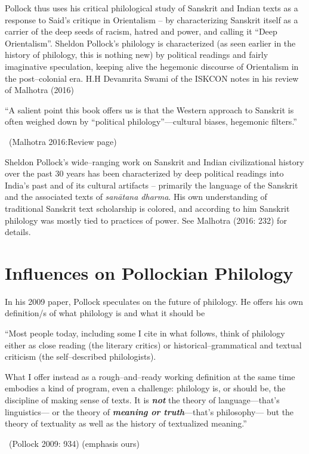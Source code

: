 Pollock thus uses his critical philological study of Sanskrit and Indian texts as a response to Said’s critique in Orientalism – by characterizing Sanskrit itself as a carrier of the deep seeds of racism, hatred and power, and calling it “Deep Orientalism”. Sheldon Pollock’s philology is characterized (as seen earlier in the history of philology, this is nothing new) by political readings and fairly imaginative speculation, keeping alive the hegemonic discourse of Orientalism in the post–colonial era. H.H Devamrita Swami of the ISKCON notes in his review of Malhotra (2016)

\begin{myquote}
“A salient point this book offers us is that the Western approach to Sanskrit is often weighed down by “political philology”—cultural biases, hegemonic filters.”

~\hfill (Malhotra 2016:Review page)
\end{myquote}

Sheldon Pollock’s wide–ranging work on Sanskrit and Indian civilizational history over the past 30 years has been characterized by deep political readings into India’s past and of its cultural artifacts – primarily the language of the Sanskrit and the associated texts of \textit{sanātana dharma}. His own understanding of traditional Sanskrit text scholarship is colored, and according to him Sanskrit philology was mostly tied to practices of power. See Malhotra (2016: 232) for details.


\section*{Influences on Pollockian Philology}

In his 2009 paper, Pollock speculates on the future of philology. He offers his own definition/s of what philology is and what it should be

\begin{myquote}
“Most people today, including some I cite in what follows, think of philology either as close reading (the literary critics) or historical–grammatical and textual criticism (the self–described philologists).
\end{myquote}

\begin{myquote}
What I offer instead as a rough–and–ready working definition at the same time embodies a kind of program, even a challenge: philology is, or should be, the discipline of making sense of texts. It is \textbf{\textit{not}} the theory of language—that’s linguistics— or the theory of \textbf{\textit{meaning or truth}}—that’s philosophy— but the theory of textuality as well as the history of textualized meaning.”

~\hfill (Pollock 2009: 934) (emphasis ours)
\end{myquote}

